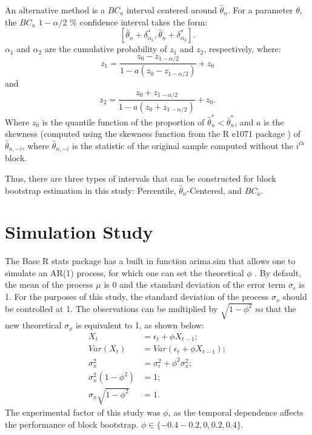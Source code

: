 \documentclass[12pt, letterpaper, titlepage]{article}
\begin{document}
An alternative method is a $BC_a$ interval centered around $\hat{\theta}_{n}$.
For a parameter $\theta$, the $BC_a$ $1 - \alpha$/2 \% confidence interval
takes the form:
\[ [\hat{\theta}_{n} + \delta^*_{\alpha_1},
  \hat{\theta}_{n} + \delta^*_{\alpha_2}].\] 
$\alpha_{1}$ and $\alpha_{2}$ are the cumulative probability of $z_{1}$ and
$z_{2}$, respectively, where:
\[z_{1} = \frac{z_{0} - z_{1 - \alpha/2}}{1 - a(z_{0} - z_{1 - \alpha/2})} +
z_{0}\] and
\[z_{2} = \frac{z_{0} + z_{1 - \alpha/2}}{1 - a(z_{0} + z_{1 - \alpha/2})} +
z_{0}.\] 
Where $z_0$ is the quantile function of the proportion of
$\hat\theta_n^* < \bar\theta_n^*$, and $a$ is the skewness (computed using
the skewness function from the R e1071 package \citep{e1071}) of
$\hat{\theta}_{n, -i}$, where $\hat{\theta}_{n, -i}$ is the statistic of the
original sample computed without the $i^{th}$ block.


Thus, there are three types of intervals that can be constructed for block
bootstrap estimation in this study: Percentile, $\hat{\theta}_{n}$-Centered,
and $BC_a$. 


\section{Simulation Study}
\label{sec:simstudy}


The Base R stats package has a built in function arima.sim that allows one to
simulate an AR(1) process, for which one can set the theoretical $\phi$
\citep{R}. By default, the mean of the process $\mu$ is 0 and the standard
deviation of the error term $\sigma_{\epsilon}$ is 1. For the purposes of this
study, the standard deviation of the process $\sigma_{x}$ should be controlled
at 1. The observations can be multiplied by $\sqrt{1 - \phi^2}$ so that the new
theoretical $\sigma_{x}$ is equivalent to 1, as shown below:
\begin{align}
X_{t} &= \epsilon_{t} + \phi X_{t-1};\\
Var(X_{t}) &= Var(\epsilon_{t} + \phi X_{t-1});\\
\sigma^2_{x} &= \sigma^2_{\epsilon} + \phi^2 \sigma^2_{x};\\
\sigma^2_{x}(1 - \phi^2) &= 1;\\
\sigma_{x}\sqrt{1 - \phi^2} &= 1.
\end{align}
The experimental factor of this study was $\phi$, as the temporal dependence
affects the performance of block bootstrap.
$\phi \in \{-0.4 -0.2, 0, 0.2, 0.4\}$.
\end{document}
